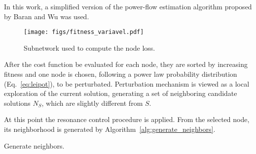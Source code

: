 \documentclass[11pt]{article}
\begin{document}
In this work, a simplified version of the power-flow estimation algorithm proposed by Baran and Wu 
\citep{Baran1989} was used.

\begin{figure}[!ht]
	\centering
	\texttt{[image: figs/fitness\_variavel.pdf]}
	\caption{Subnetwork used to compute the node loss.}
	\label{fig:fitness_variable}
\end{figure}

After the cost function be evaluated for each node, they are sorted by increasing fitness and 
one node is chosen, following a power law probability distribution (Eq.~\ref{eq:leipot}), to 
be perturbated. Perturbation mechanism is viewed as a local exploration of the current solution, 
generating a set of neighboring candidate solutions $N_S$, which are slightly different from $S$.

At this point the resonance control procedure is applied. From the selected node, 
its neighborhood is generated by Algorithm~\ref{alg:generate_neighbors}. 

	
\begin{algorithm}
		\DontPrintSemicolon
    \caption{Generate neighbors.}
    \label{alg:generate_neighbors}
\end{algorithm}
\end{document}
